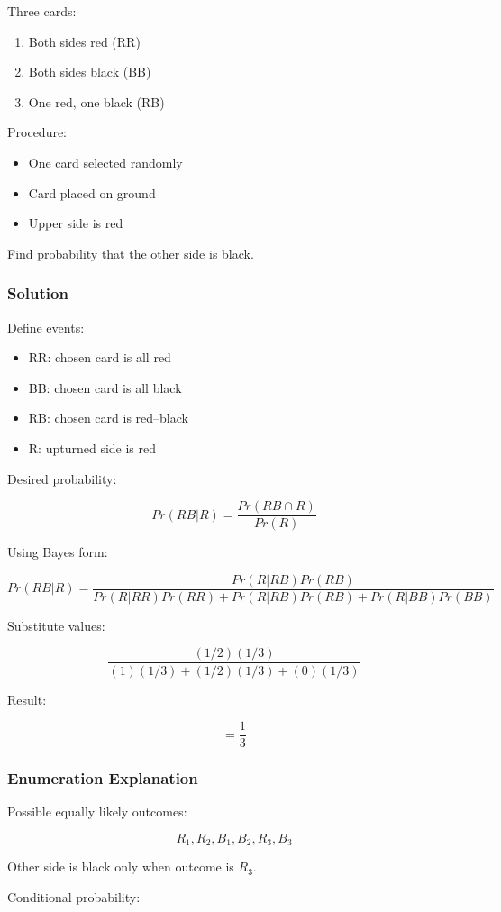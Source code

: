 \documentclass[12pt]{article}
\begin{document}
Three cards:
\begin{enumerate}
\item Both sides red (RR)
\item Both sides black (BB)
\item One red, one black (RB)
\end{enumerate}

Procedure:
\begin{itemize}
\item One card selected randomly
\item Card placed on ground
\item Upper side is red
\end{itemize}

Find probability that the other side is black.

\subsubsection*{Solution}

Define events:
\begin{itemize}
\item RR: chosen card is all red
\item BB: chosen card is all black
\item RB: chosen card is red--black
\item R: upturned side is red
\end{itemize}

Desired probability:

\[
Pr(RB|R) =
\frac{Pr(RB \cap R)}{Pr(R)}
\]

Using Bayes form:

\[
Pr(RB|R)=
\frac{Pr(R|RB)Pr(RB)}
{Pr(R|RR)Pr(RR)+Pr(R|RB)Pr(RB)+Pr(R|BB)Pr(BB)}
\]

Substitute values:

\[
\frac{(1/2)(1/3)}
{(1)(1/3)+(1/2)(1/3)+(0)(1/3)}
\]

Result:

\[
= \frac{1}{3}
\]

\subsubsection*{Enumeration Explanation}

Possible equally likely outcomes:

\[
R_1, R_2, B_1, B_2, R_3, B_3
\]

Other side is black only when outcome is $R_3$.

Conditional probability:
\end{document}
